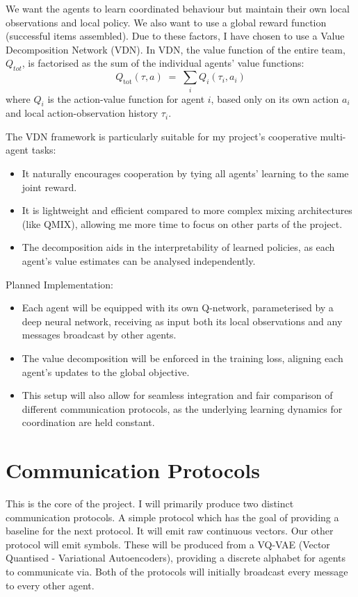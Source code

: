 \documentclass[20pt]{article}
\begin{document}
We want the agents to learn coordinated behaviour but maintain their own local observations and local policy. We also want to use a global reward function (successful items assembled). Due to these factors, I have chosen to use a Value Decomposition Network (VDN).
In VDN, the value function of the entire team, $Q_{tot}$, is factorised as the sum of the individual agents' value functions:
\[
Q_{\mathrm{tot}}(\tau, a) \;=\; \sum_{i} Q_{i}(\tau_{i}, a_{i})
\]
where $Q_i$ is the action-value function for agent $i$, based only on its own action $a_i$ and local action-observation history $\tau_i$.

The VDN framework is particularly suitable for my project’s cooperative multi-agent tasks:
\begin{itemize}
\item It naturally encourages cooperation by tying all agents’ learning to the same joint reward.
\item It is lightweight and efficient compared to more complex mixing architectures (like QMIX), allowing me more time to focus on other parts of the project.
\item The decomposition aids in the interpretability of learned policies, as each agent’s value estimates can be analysed independently.
\end{itemize}

Planned Implementation:
\begin{itemize}
\item Each agent will be equipped with its own Q-network, parameterised by a deep neural network, receiving as input both its local observations and any messages broadcast by other agents.
\item The value decomposition will be enforced in the training loss, aligning each agent’s updates to the global objective.
\item This setup will also allow for seamless integration and fair comparison of different communication protocols, as the underlying learning dynamics for coordination are held constant.
\end{itemize}

\section*{Communication Protocols}
This is the core of the project. I will primarily produce two distinct communication protocols. A simple protocol which has the goal of providing a baseline for the next protocol. It will emit raw continuous vectors. Our other protocol will emit symbols. These will be produced from a VQ-VAE (Vector Quantised - Variational Autoencoders), providing a discrete alphabet for agents to communicate via. Both of the protocols will initially broadcast every message to every other agent.
\end{document}
